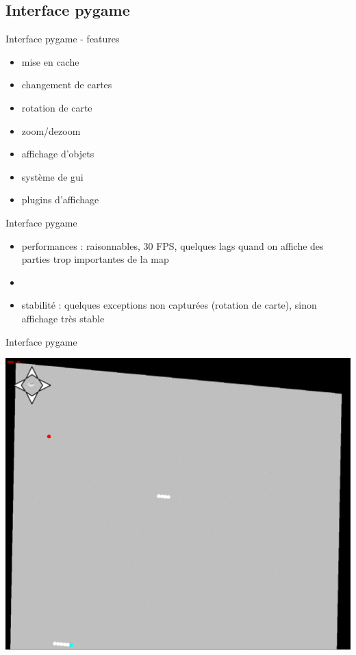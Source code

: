 \documentclass[11pt]{beamer}
\begin{document}
\subsection{Interface pygame}
\begin{frame}{Interface pygame - features}
	\begin{itemize}
		\item mise en cache
    \item changement de cartes
    \item rotation de carte
    \item zoom/dezoom
    \item affichage d'objets
    \item système de gui
    \item plugins d'affichage
	\end{itemize}
\end{frame}

\begin{frame}{Interface pygame}
	\begin{itemize}
    \item performances : raisonnables, 30 FPS, quelques lags quand on affiche des parties trop importantes de la map
		\item[]
    \item stabilité : quelques exceptions non capturées (rotation de carte), sinon affichage très stable
	\end{itemize}
\end{frame}

\begin{frame}{Interface pygame}
	\begin{center}\includegraphics[scale=0.2]{game_screenshot.png}\end{center}
\end{frame}
\end{document}

